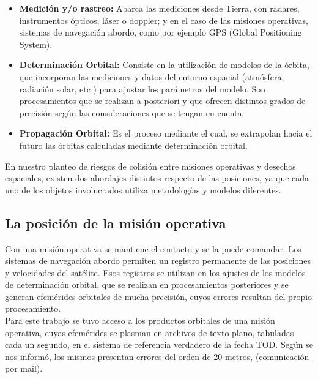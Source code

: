 \begin{itemize}
\itemsep0em
 \item {\bf{Medici\'on y/o rastreo:}} Abarca las mediciones desde Tierra, con radares, instrumentos \'opticos, l\'aser o doppler; y en el caso de las misiones operativas, sistemas de navegaci\'on abordo, como por ejemplo GPS (Global Positioning System).\\
 \item {\bf{Determinaci\'on Orbital:}} Consiste en la utilizaci\'on de modelos de la \'orbita, que incorporan las mediciones y datos del entorno espacial (atm\'osfera, radiaci\'on solar, etc ) para ajustar los par\'ametros del modelo. Son procesamientos que se realizan a posteriori y que ofrecen distintos grados de precisión seg\'un las consideraciones que se tengan en cuenta.\\
 \item {\bf{Propagaci\'on Orbital:}} Es el proceso mediante el cual, se extrapolan hacia el futuro las \'orbitas calculadas mediante determinaci\'on orbital.\\
\end{itemize}


En nuestro planteo de riesgos de colisi\'on entre misiones operativas y desechos espaciales, existen dos abordajes distintos respecto de las posiciones, ya que cada uno de los objetos involucrados utiliza metodolog\'ias y modelos diferentes.

\subsection{La posici\'on de la misi\'on operativa}

Con una misi\'on operativa se mantiene el contacto y se la puede comandar. Los sistemas de navegaci\'on abordo permiten un registro permanente de las posiciones y velocidades del sat\'elite. Esos registros se utilizan en los ajustes de los modelos de determinaci\'on orbital, que se realizan en procesamientos posteriores y se generan efem\'erides orbitales de mucha precisi\'on, cuyos errores resultan del propio procesamiento.\\

Para este trabajo se tuvo acceso a los productos orbitales de una misi\'on operativa, cuyas efem\'erides se plasman en archivos de texto plano, tabuladas cada un segundo, en el sistema de referencia verdadero de la fecha \ac{TOD}. Seg\'un se nos inform\'o, los mismos presentan errores del orden de  20 metros, (comunicaci\'on por mail).\\

